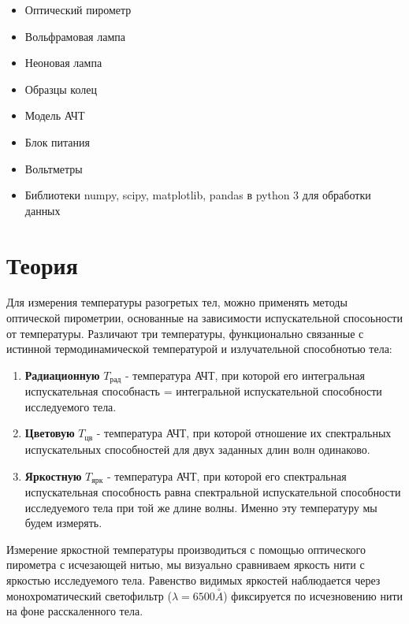 \documentclass[a4paper]{article}
\begin{document}
\begin{itemize}
    \item Оптический пирометр
    \item Вольфрамовая лампа
    \item Неоновая лампа
    \item Образцы колец
    \item Модель АЧТ
    \item Блок питания
    \item Вольтметры
    \item Библиотеки numpy, scipy, matplotlib, pandas в python 3 для обработки данных
\end{itemize}



\section{Теория}

Для измерения температуры разогретых тел, можно применять методы оптической пирометрии, основанные 
на зависимости испускательной спосоьности от температуры. Различают три температуры, функционально 
связанные с истинной термодинамической температурой и излучательной способнотью тела:

\begin{enumerate}
    \item \textbf{Радиационную} $T_{\text{рад}}$ - температура АЧТ, при которой его интегральная 
    испускательная способнасть = интегральной испускательной способности исследуемого тела.
    \item \textbf{Цветовую} $T_{\text{цв}}$ - температура АЧТ, при которой отношение их спектральных 
    испускательных способностей для двух заданных длин волн одинаково.
    \item \textbf{Яркостную} $T_{\text{ярк}}$ - температура АЧТ, при которой его спектральная испускательная
    способность равна спектральной испускательной способности исследуемого тела при той же длине волны.
    Именно эту температуру мы будем измерять. 
\end{enumerate}

Измерение яркостной температуры производиться с помощью оптического пирометра с исчезающей нитью,
мы визуально сравниваем яркость нити с яркостью исследуемого тела. Равенство  видимых яркостей наблюдается 
через монохроматический светофильтр ($\lambda = 6500 \stackrel{\circ}{A}$) фиксируется по исчезновению
нити на фоне расскаленного тела. \par
\end{document}
